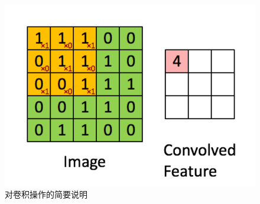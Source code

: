\begin{figure}[h]
  \centering
  \includegraphics[width=0.7\linewidth]{Img/conv.png}
  \caption{对卷积操作的简要说明}
  \label{fig:conv}
\end{figure}
